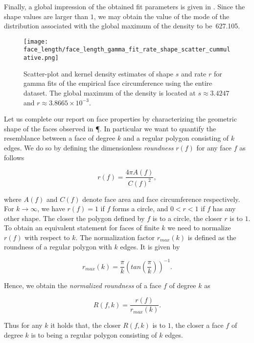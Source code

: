 		Finally, a global impression of the obtained fit parameters is given in . Since the shape values are larger than $1$, we may obtain the value of the mode of the distribution associated with the global maximum of the density to be~\SI{627.105}{\pixel}.

		\begin{figure}[!htbp]
			\centering
				\texttt{[image: face\_length/face\_length\_gamma\_fit\_rate\_shape\_scatter\_cummulative.png]}
			\caption[Face circumference distribution - Fit parameter densities]{Scatter-plot and kernel density estimates of shape $s$ and rate $r$ for gamma fits of the empirical face circumference using the entire dataset. The global maximum of the density is located at $s \approx 3.4247$ and $r \approx 3.8665 \times 10^{-3}$.}
			\label{fig:face_length_kde}
		\end{figure}

		Let us complete our report on face properties by characterizing the geometric shape of the faces observed in \P. In particular we want to quantify the resemblance between a face of degree $k$ and a regular polygon consisting of $k$ edges. We do so by defining the dimensionless \emph{roundness} $r(f)$ for any face $f$ as follows

		\begin{equation}
			 r(f) = \frac{4 \pi A(f)}{C(f)^2},
		\end{equation}

		where $A(f)$ and $C(f)$ denote face area and face circumference respectively. For $k \to \infty$, we have $r(f) = 1$ if $f$ forms a circle, and $0 < r < 1$ if $f$ has any other shape. The closer the polygon defined by $f$ is to a circle, the closer $r$ is to $1$. To obtain an equivalent statement for faces of finite $k$ we need to normalize $r(f)$ with respect to $k$. The normalization factor $r_{max}(k)$ is defined as the roundness of a regular polygon with $k$ edges. It is given by

		\begin{equation}
			r_{max}(k) = \frac{\pi}{k} (tan(\frac{\pi}{k}))^{-1}.
		\end{equation}

		Hence, we obtain the \emph{normalized roundness} of a face $f$ of degree $k$ as

		\begin{equation}
			R(f,k) = \frac{r(f)}{r_{max}(k)}.
		\end{equation}

		Thus for any $k$ it holds that, the closer $R(f,k)$ is to $1$, the closer a face $f$ of degree $k$ is to being a regular polygon consisting of $k$ edges. 

